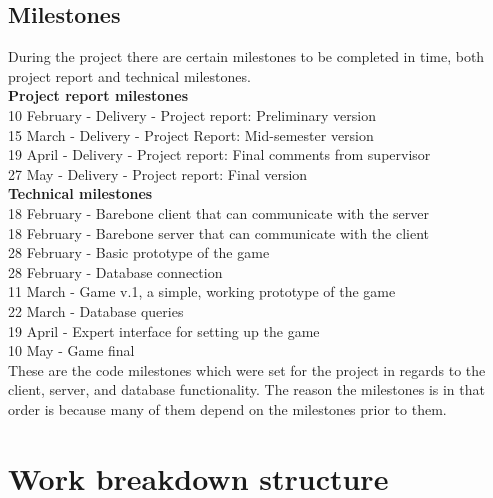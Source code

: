 \subsection{Milestones} 
During the project there are certain milestones to be completed in time, both project report and technical milestones. \\
\newline
\textbf{Project report milestones}\\
10 February - Delivery - Project report: Preliminary version\\
15 March - Delivery - Project Report: Mid-semester version\\
19 April - Delivery - Project report: Final comments from supervisor\\
27 May - Delivery - Project report: Final version\\
\newline
\textbf{Technical milestones} \\
18 February - Barebone client that can communicate with the server \\
18 February - Barebone server that can communicate with the client\\
28 February - Basic prototype of the game\\
28 February - Database connection\\
11 March - Game v.1, a simple, working prototype of the game\\
22 March - Database queries\\
19 April - Expert interface for setting up the game\\
10 May - Game final\\
\newline
These are the code milestones which were set for the project in regards to the 
client, server, and database functionality. The reason the milestones is in that 
order is because many of them depend on the milestones prior to them. \\


\section{Work breakdown structure}

